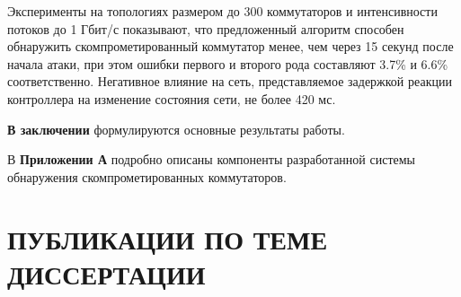 \documentclass[14pt,autoref,href]{disser}
\theoremstyle{definition}
\begin{document}
Эксперименты на топологиях размером до 300 коммутаторов и интенсивности потоков до 1 Гбит/с показывают, что предложенный алгоритм способен обнаружить скомпрометированный коммутатор менее, чем через 15 секунд после начала атаки, при этом ошибки первого и второго рода составляют 3.7\% и 6.6\% соответственно.
Негативное влияние на сеть, представляемое задержкой реакции контроллера на изменение состояния сети, не более 420 мс.

\textbf{В заключении} формулируются основные результаты работы.

В \textbf{Приложении А} подробно описаны компоненты разработанной системы обнаружения скомпрометированных коммутаторов.

\newpage
\section*{ПУБЛИКАЦИИ ПО ТЕМЕ ДИССЕРТАЦИИ}
\end{document}
